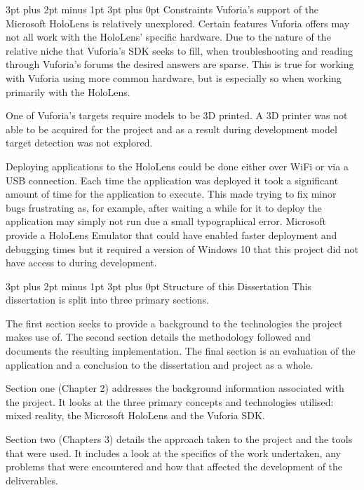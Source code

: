 \documentclass[12pt,a4paper,oneside]{article}
\makeatletter
\renewcommand\subsubsection{\@startsection {subsubsection}{1}{0mm} %
	                           {3pt plus 2pt minus 1pt} %
	                           {3pt plus 0pt} %
	                           {\normalfont\bfseries}}
\renewcommand\subsection{\@startsection {subsection}{1}{0mm} %
                               {3pt plus 2pt minus 1pt} %
                               {3pt plus 0pt} %
                               {\large\bfseries}}
\makeatother
\begin{document}
\subsubsection{Constraints}
Vuforia's support of the Microsoft HoloLens is relatively unexplored. Certain features Vuforia offers may not all work with the HoloLens' specific hardware. Due to the nature of the relative niche that Vuforia's SDK seeks to fill, when troubleshooting and reading through Vuforia's forums the desired answers are sparse. This is true for working with Vuforia using more common hardware, but is especially so when working primarily with the HoloLens.

One of Vuforia's targets require models to be 3D printed. A 3D printer was not able to be acquired for the project and as a result during development model target detection was not explored.

Deploying applications to the HoloLens could be done either over WiFi or via a USB connection. Each time the application was deployed it took a significant amount of time for the application to execute. This made trying to fix minor bugs frustrating as, for example, after waiting a while for it to deploy the application may simply not run due a small typographical error. Microsoft provide a HoloLens Emulator that could have enabled faster deployment and debugging times but it required a version of Windows 10 that this project did not have access to during development.

\subsection{Structure of this Dissertation}
This dissertation is split into three primary sections.

The first section seeks to provide a background to the technologies the project makes use of. The second section details the methodology followed and documents the resulting implementation. The final section is an evaluation of the application and a conclusion to the dissertation and project as a whole.

Section one (Chapter 2) addresses the background information associated with the project. It looks at the three primary concepts and technologies utilised: mixed reality, the Microsoft HoloLens and the Vuforia SDK.

Section two (Chapters 3) details the approach taken to the project and the tools that were used. It includes a look at the specifics of the work undertaken, any problems that were encountered and how that affected the development of the deliverables.
\end{document}
